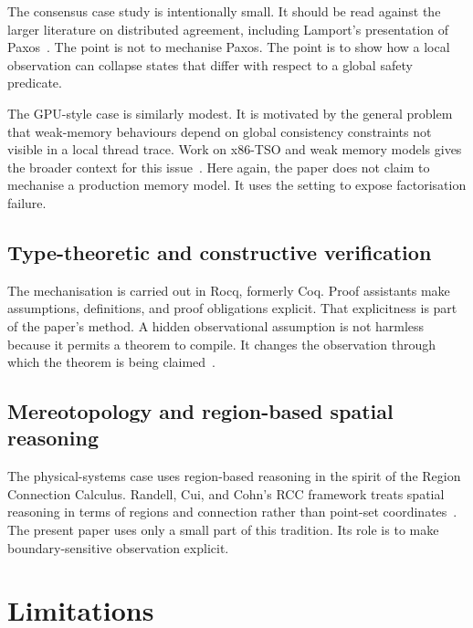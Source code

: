 \documentclass[a4paper,11pt]{article}
\begin{document}
The consensus case study is intentionally small. It should be read against the
larger literature on distributed agreement, including Lamport's presentation of
Paxos~\cite{lamport2001paxos}. The point is not to mechanise Paxos. The point is
to show how a local observation can collapse states that differ with respect to
a global safety predicate.

The GPU-style case is similarly modest. It is motivated by the general problem
that weak-memory behaviours depend on global consistency constraints not
visible in a local thread trace. Work on x86-TSO and weak memory models gives
the broader context for this issue~\cite{owens2009x86tso,alglave2014herding}.
Here again, the paper does not claim to mechanise a production memory model. It
uses the setting to expose factorisation failure.

\subsection{Type-theoretic and constructive verification}

The mechanisation is carried out in Rocq, formerly Coq. Proof assistants make
assumptions, definitions, and proof obligations explicit. That explicitness is
part of the paper's method. A hidden observational assumption is not harmless
because it permits a theorem to compile. It changes the observation through
which the theorem is being claimed~\cite{coq2024}.

\subsection{Mereotopology and region-based spatial reasoning}

The physical-systems case uses region-based reasoning in the spirit of the
Region Connection Calculus. Randell, Cui, and Cohn's RCC framework treats
spatial reasoning in terms of regions and connection rather than point-set
coordinates~\cite{randell1992rcc}. The present paper uses only a small part of this
tradition. Its role is to make boundary-sensitive observation explicit.

\section{Limitations}
\label{sec:limitations}
\end{document}
